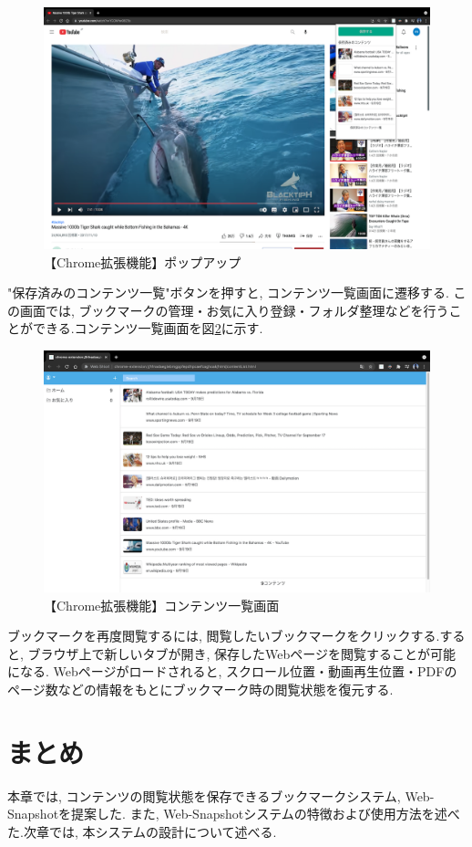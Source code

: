 \begin{figure}[htbp]
  \caption{【Chrome拡張機能】ポップアップ}
  \label{fig:usage-chrome-popup}
  \begin{center}
    \includegraphics[bb=0 0 915 667,width=15cm]{img/usage-chrome-popup.pdf}
  \end{center}
\end{figure}

"保存済みのコンテンツ一覧"ボタンを押すと, コンテンツ一覧画面に遷移する.
この画面では, ブックマークの管理・お気に入り登録・フォルダ整理などを行うことができる.コンテンツ一覧画面を図\ref{fig:usage-chrome-list}に示す.

\begin{figure}[htbp]
  \caption{【Chrome拡張機能】コンテンツ一覧画面}
  \label{fig:usage-chrome-list}
  \begin{center}
    \includegraphics[bb=0 0 915 667,width=15cm]{img/usage-chrome-list.pdf}
  \end{center}
\end{figure}

ブックマークを再度閲覧するには, 閲覧したいブックマークをクリックする.すると, ブラウザ上で新しいタブが開き, 保存したWebページを閲覧することが可能になる.
Webページがロードされると, スクロール位置・動画再生位置・PDFのページ数などの情報をもとにブックマーク時の閲覧状態を復元する.

\section{まとめ}
本章では, コンテンツの閲覧状態を保存できるブックマークシステム, Web-Snapshotを提案した.
また, Web-Snapshotシステムの特徴および使用方法を述べた.次章では, 本システムの設計について述べる.